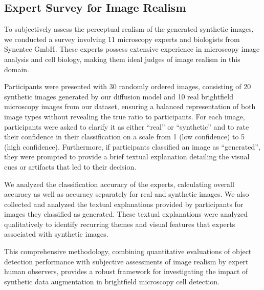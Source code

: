 \subsection{Expert Survey for Image Realism}
\label{subsec:expert-survey-for-image-realism}
To subjectively assess the perceptual realism of the generated synthetic images, we conducted a survey involving 11 microscopy experts and biologists from Synentec GmbH.
These experts possess extensive experience in microscopy image analysis and cell biology, making them ideal judges of image realism in this domain.

Participants were presented with 30 randomly ordered images, consisting of 20 synthetic images generated by our diffusion model and 10 real brightfield microscopy images from our dataset, ensuring a balanced representation of both image types without revealing the true ratio to participants.
For each image, participants were asked to clarify it as either ``real'' or ``synthetic'' and to rate their confidence in their classification on a scale from 1 (low confidence) to 5 (high confidence).
Furthermore, if participants classified an image as ``generated'', they were prompted to provide a brief textual explanation detailing the visual cues or artifacts that led to their decision.

We analyzed the classification accuracy of the experts, calculating overall accuracy as well as accuracy separately for real and synthetic images.
We also collected and analyzed the textual explanations provided by participants for images they classified as generated.
These textual explanations were analyzed qualitatively to identify recurring themes and visual features that experts associated with synthetic images.

This comprehensive methodology, combining quantitative evaluations of object detection performance with subjective assessments of image realism by expert human observers, provides a robust framework for investigating the impact of synthetic data augmentation in brightfield microscopy cell detection.